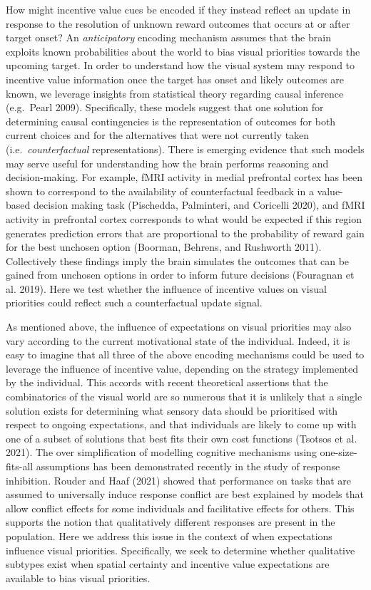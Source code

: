 \documentclass[11pt,halfline,a4paper,]{ouparticle}
\begin{document}
How might incentive value cues be encoded if they instead reflect an update in response to the resolution of unknown reward outcomes that occurs at or after target onset? An \emph{anticipatory} encoding mechanism assumes that the brain exploits known probabilities about the world to bias visual priorities towards the upcoming target. In order to understand how the visual system may respond to incentive value information once the target has onset and likely outcomes are known, we leverage insights from statistical theory regarding causal inference (e.g.~Pearl 2009). Specifically, these models suggest that one solution for determining causal contingencies is the representation of outcomes for both current choices and for the alternatives that were not currently taken (i.e.~\emph{counterfactual} representations). There is emerging evidence that such models may serve useful for understanding how the brain performs reasoning and decision-making. For example, fMRI activity in medial prefrontal cortex has been shown to correspond to the availability of counterfactual feedback in a value-based decision making task (Pischedda, Palminteri, and Coricelli 2020), and fMRI activity in prefrontal cortex corresponds to what would be expected if this region generates prediction errors that are proportional to the probability of reward gain for the best unchosen option (Boorman, Behrens, and Rushworth 2011). Collectively these findings imply the brain simulates the outcomes that can be gained from unchosen options in order to inform future decisions (Fouragnan et al. 2019). Here we test whether the influence of incentive values on visual priorities could reflect such a counterfactual update signal.

As mentioned above, the influence of expectations on visual priorities may also vary according to the current motivational state of the individual. Indeed, it is easy to imagine that all three of the above encoding mechanisms could be used to leverage the influence of incentive value, depending on the strategy implemented by the individual. This accords with recent theoretical assertions that the combinatorics of the visual world are so numerous that it is unlikely that a single solution exists for determining what sensory data should be prioritised with respect to ongoing expectations, and that individuals are likely to come up with one of a subset of solutions that best fits their own cost functions (Tsotsos et al. 2021). The over simplification of modelling cognitive mechanisms using one-size-fits-all assumptions has been demonstrated recently in the study of response inhibition. Rouder and Haaf (2021) showed that performance on tasks that are assumed to universally induce response conflict are best explained by models that allow conflict effects for some individuals and facilitative effects for others. This supports the notion that qualitatively different responses are present in the population. Here we address this issue in the context of when expectations influence visual priorities. Specifically, we seek to determine whether qualitative subtypes exist when spatial certainty and incentive value expectations are available to bias visual priorities.
\end{document}
